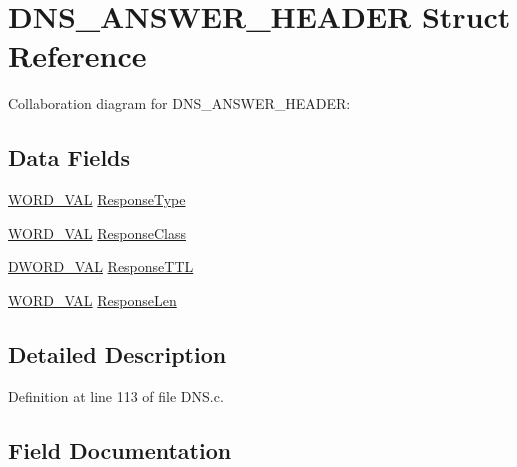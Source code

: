 \hypertarget{struct_d_n_s___a_n_s_w_e_r___h_e_a_d_e_r}{}\section{D\+N\+S\+\_\+\+A\+N\+S\+W\+E\+R\+\_\+\+H\+E\+A\+D\+E\+R Struct Reference}
\label{struct_d_n_s___a_n_s_w_e_r___h_e_a_d_e_r}


Collaboration diagram for D\+N\+S\+\_\+\+A\+N\+S\+W\+E\+R\+\_\+\+H\+E\+A\+D\+E\+R\+:
\subsection*{Data Fields}
\begin{DoxyCompactItemize}
\item 
\hyperlink{union_w_o_r_d___v_a_l}{W\+O\+R\+D\+\_\+\+V\+A\+L} \hyperlink{struct_d_n_s___a_n_s_w_e_r___h_e_a_d_e_r_a5b116e50e6294cac035f57e585f8567a}{Response\+Type}
\item 
\hyperlink{union_w_o_r_d___v_a_l}{W\+O\+R\+D\+\_\+\+V\+A\+L} \hyperlink{struct_d_n_s___a_n_s_w_e_r___h_e_a_d_e_r_adbdc4fc93829b3fb0996b65c29de0c8b}{Response\+Class}
\item 
\hyperlink{union_d_w_o_r_d___v_a_l}{D\+W\+O\+R\+D\+\_\+\+V\+A\+L} \hyperlink{struct_d_n_s___a_n_s_w_e_r___h_e_a_d_e_r_a9ef358928271f1041d66a00893635927}{Response\+T\+T\+L}
\item 
\hyperlink{union_w_o_r_d___v_a_l}{W\+O\+R\+D\+\_\+\+V\+A\+L} \hyperlink{struct_d_n_s___a_n_s_w_e_r___h_e_a_d_e_r_a6edeabeb7325e6eda773b30ce548da64}{Response\+Len}
\end{DoxyCompactItemize}


\subsection{Detailed Description}


Definition at line 113 of file D\+N\+S.\+c.



\subsection{Field Documentation}
\hypertarget{struct_d_n_s___a_n_s_w_e_r___h_e_a_d_e_r_adbdc4fc93829b3fb0996b65c29de0c8b}{}
